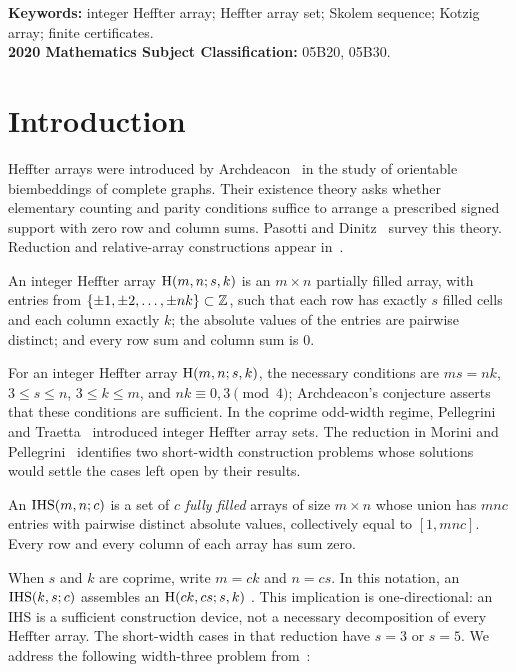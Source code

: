\noindent\textbf{Keywords:} integer Heffter array; Heffter array set; Skolem sequence; Kotzig array;
finite certificates.\\
\textbf{2020 Mathematics Subject Classification:} 05B20, 05B30.

\section{Introduction}\label{sec:intro}

Heffter arrays were introduced by Archdeacon~\cite{Arch2015} in the study of orientable
biembeddings of complete graphs.  Their existence theory asks whether elementary counting and
parity conditions suffice to arrange a prescribed signed support with zero row and column sums.
Pasotti and Dinitz~\cite{PasottiDinitz2024} survey this theory.  Reduction and relative-array
constructions appear in~\cite{MoriniPellegrini2020,MoriniPellegrini2022}.

\begin{definition}
An integer Heffter array $\mathrm{H}(m,n;s,k)$ is an $m\times n$ partially filled array, with entries from
$\{\pm1,\pm2,\dots,\pm nk\}\subset\mathbb{Z}$, such that each row has exactly $s$ filled cells and each column
exactly $k$; the absolute values of the entries are pairwise distinct; and every row sum and column sum
is $0$.
\end{definition}

For an integer Heffter array $\mathrm{H}(m,n;s,k)$, the necessary conditions are
$ms=nk$, $3\le s\le n$, $3\le k\le m$, and $nk\equiv0,3\pmod4$; Archdeacon's conjecture
asserts that these conditions are sufficient. In the coprime odd-width regime, Pellegrini and
Traetta~\cite{PT2025} introduced integer Heffter array sets.  The reduction in
Morini and Pellegrini~\cite{MP2025} identifies two short-width construction problems whose
solutions would settle the cases left open by their results.

\begin{definition}
An $\mathrm{IHS}(m,n;c)$ is a set of $c$ \emph{fully filled} arrays of size $m\times n$ whose union has
$mnc$ entries with
pairwise distinct absolute values, collectively equal to $[1,mnc]$. Every row and every column of each
array has sum zero.
\end{definition}

When $s$ and $k$ are coprime, write $m=ck$ and $n=cs$. In this notation, an $\mathrm{IHS}(k,s;c)$
assembles an $\mathrm{H}(ck,cs;s,k)$ \cite[proof of Theorem~C]{MP2025}.  This implication is
one-directional: an IHS is a sufficient construction device, not a necessary decomposition of
every Heffter array.  The short-width cases in that reduction have $s=3$ or $s=5$.
We address the following width-three problem from~\cite{MP2025}:

